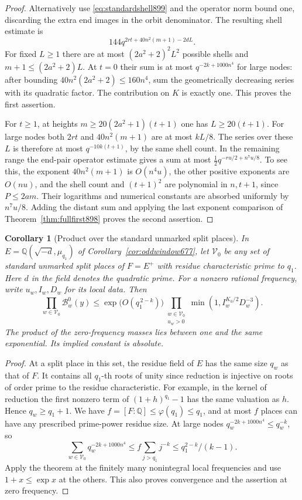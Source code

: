 \documentclass[a4paper,11pt]{article}
\newtheorem{corollary}[proposition]{Corollary}
\theoremstyle{definition}
\theoremstyle{remark}
\numberwithin{equation}{section}
\begin{document}
\begin{proof}
Alternatively use \eqref{eq:standardshell899} and the operator
norm bound one, discarding the extra end images in the orbit
denominator. The resulting shell estimate is
\[
                  144q^{2rt+40n^2(m+1)-2dL}.
\]
For fixed \(L\ge1\) there are at most \((2a^2+2)^2 L^2\)
possible shells and \(m+1\le(2a^2+2)L\). At \(t=0\) their sum
is at most \(q^{-2k+1000n^4}\) for large nodes: after bounding
\(40n^2(2a^2+2)\le160n^4\), sum the geometrically decreasing
series with its quadratic factor. The contribution on \(K\)
is exactly one. This proves the first assertion.

For \(t\ge1\), at heights \(m\ge20(2a^2+1)(t+1)\) one has
\(L\ge20(t+1)\). For large nodes both \(2rt\) and
\(40n^2(m+1)\) are at most \(kL/8\). The series over these
\(L\) is therefore at most \(q^{-10k(t+1)}\), by the same
shell count. In the remaining range the end-pair operator
estimate gives a sum at most
\(\tfrac12 q^{-ru/2+n^7u/8}\). To see this, the exponent
\(40n^2(m+1)\) is \(O(n^4u)\), the other positive exponents
are \(O(nu)\), and the shell count and \((t+1)^2\) are polynomial
in \(n,t+1\), since \(P\le2am\). Their logarithms and numerical
constants are absorbed uniformly by \(n^7u/8\).
Adding the distant sum and applying the last exponent comparison
of Theorem~\ref{thm:fullfirst898} proves the second assertion.
\end{proof}

\begin{corollary}[Product over the standard unmarked split places]
\leavevmode\label{cor:standardeuler899}
In \(E=\mathbb Q(\sqrt{-d},\mu_{q_1})\) of
Corollary~\ref{cor:oddwindow677}, let \(\mathcal V_0\) be any set
of standard unmarked split places of \(F=E^+\) with residue
characteristic prime to \(q_1\). Here \(d\) in the field denotes
the quadratic prime. For a nonzero rational frequency, write
\(u_w,I_w,D_w\) for its local data. Then
\[
 \prod_{w\in\mathcal V_0}\mathcal B^0_w(y)
 \le \exp\!\big(O(q_1^{\,2-k})\big)
       \prod_{\substack{w\in\mathcal V_0\\u_w>0}}
                     \min(1,I_w^{K_0/2}D_w^{-3}).
\]
The product of the zero-frequency masses lies between one and
the same exponential. Its implied constant is absolute.
\end{corollary}
\begin{proof}
At a split place in this set, the residue field of \(E\) has the
same size \(q_w\) as that of \(F\). It contains all \(q_1\)-th
roots of unity since reduction is injective on roots of order
prime to the residue characteristic. For example, in the kernel
of reduction the first nonzero term of \((1+h)^{q_1}-1\)
has the same valuation as \(h\). Hence \(q_w\ge q_1+1\).
We have \(f=[F:\mathbb Q]\le\varphi(q_1)\le q_1\), and at most
\(f\) places can have any prescribed prime-power residue size.
At large nodes \(q_w^{-2k+1000n^4}\le q_w^{-k}\), so
\[
 \sum_{w\in\mathcal V_0}q_w^{-2k+1000n^4}
          \le f\sum_{j>q_1} j^{-k}\le q_1^{2-k}/(k-1).
\]
Apply the theorem at the finitely many nonintegral local frequencies
and use \(1+x\le\exp x\) at the others. This also proves convergence
and the assertion at zero frequency.
\end{proof}
\end{document}
